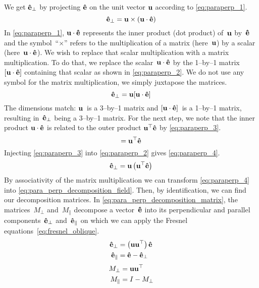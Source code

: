 We get $\textbf{ê}_\perp$ by projecting $\textbf{ê}$ on the unit vector $\textbf{u}$ according to \cref{eq:paraperp_1}.
\begin{equation}
    \textbf{ê}_\perp = \textbf{u} \times (\textbf{u} \cdot \textbf{ê}) \label{eq:paraperp_1}
\end{equation}
In \cref{eq:paraperp_1}, $\textbf{u} \cdot \textbf{ê}$ represents the inner product (dot product) of~$\textbf{u}$ by~$\textbf{ê}$ and the symbol~``$\times$'' refers to the multiplication of a matrix (here~$\textbf{u}$) by a scalar (here~$\textbf{u} \cdot \textbf{ê}$).
We wish to replace that scalar multiplication with a matrix multiplication.
To do that, we replace the scalar~$\textbf{u} \cdot \textbf{ê}$ by the 1--by--1 matrix~$[\textbf{u} \cdot \textbf{ê}]$ containing that scalar as shown in \cref{eq:paraperp_2}.
We do not use any symbol for the matrix multiplication, we simply juxtapose the matrices.
\begin{equation}
    \textbf{ê}_\perp = \textbf{u} [\textbf{u} \cdot \textbf{ê}] \label{eq:paraperp_2}
\end{equation}
The dimensions match: $\textbf{u}$~is a 3--by--1 matrix and $[\textbf{u} \cdot \textbf{ê}]$~is a 1--by--1 matrix, resulting in~$\textbf{ê}_\perp$ being a 3--by--1 matrix.
For the next step, we note that the inner product $\textbf{u} \cdot \textbf{ê}$ is related to the outer product $\textbf{u}^\top \textbf{ê}$ by \cref{eq:paraperp_3}.
\begin{equation}
    [\vect{u} \cdot \vect{ê}] = \vect{u}\transp \vect{ê} \label{eq:paraperp_3}
\end{equation}
Injecting \cref{eq:paraperp_3} into \cref{eq:paraperp_2} gives \cref{eq:paraperp_4}.
\begin{equation}
    \textbf{ê}_\perp = \textbf{u} \left( \textbf{u}^\top \textbf{ê} \right) \label{eq:paraperp_4}
\end{equation}
By associativity of the matrix multiplication we can transform \cref{eq:paraperp_4} into \cref{eq:para_perp_decomposition_field}.
Then, by identification, we can find our decomposition matrices.
In \cref{eq:para_perp_decomposition_matrix}, the matrices~$M_\perp$ and~$M_\parallel$ decompose a vector~$\textbf{ê}$ into its perpendicular and parallel components~$\textbf{ê}_\perp$ and~$\textbf{ê}_\parallel$ on which we can apply the Fresnel equations~\eqref{eq:fresnel_oblique}.
\begin{subequations}
    \begin{align}
        \textbf{ê}_\perp &= \left(\textbf{u} \textbf{u}^\top \right) \textbf{ê}
        \\
        \textbf{ê}_\parallel &= \textbf{ê} - \textbf{ê}_\perp
    \end{align}
    \label{eq:para_perp_decomposition_field}
\end{subequations}
\begin{subequations}
    \begin{align}
        M_\perp &= \textbf{u} \textbf{u}^\top   \\
        M_\parallel & = I - M_\perp
    \end{align}
    \label{eq:para_perp_decomposition_matrix}
\end{subequations}


